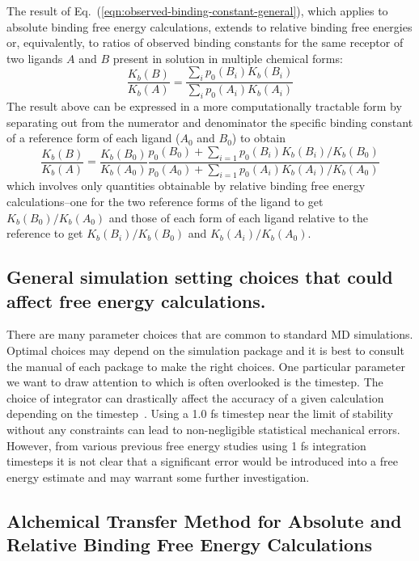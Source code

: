 \documentclass[9pt,bestpractices]{livecoms}
\begin{document}
The result of Eq.~(\ref{eqn:observed-binding-constant-general}), which applies to absolute binding free energy calculations, extends to relative binding free energies or, equivalently, to ratios of observed binding constants for the same receptor of two ligands $A$ and $B$ present in solution in multiple chemical forms:
\begin{equation}
  \frac{K_b(B)}{K_b(A)} = \frac{\sum_i p_0(B_i) K_b(B_i)}{\sum_i p_0(A_i) K_b(A_i)}
  \label{eqn:observed-binding-constant-ratio}
\end{equation}
The result above can be expressed in a more computationally tractable form by separating out from the numerator and denominator the specific binding constant of a reference form of each ligand ($A_0$ and $B_0$) to obtain\cite{de2018rigorous}
\begin{equation}
 \frac{K_b(B)}{K_b(A)} = \frac{K_b(B_0)}{K_b(A_0)} \frac{
 p_0(B_0) + \sum_{i=1} p_0(B_i) K_b(B_i)/K_b(B_0)
 }{
p_0(A_0) + \sum_{i=1} p_0(A_i) K_b(A_i)/K_b(A_0)
 }
\end{equation}
which involves only quantities obtainable by relative binding free energy calculations--one for the two reference forms of the ligand to get  $K_b(B_0)/K_b(A_0)$ and those of each form of each ligand relative to the reference to get $K_b(B_i)/K_b(B_0)$ and $K_b(A_i)/K_b(A_0)$.

\subsection{General simulation setting choices that could affect free energy calculations.}
There are many parameter choices that are common to standard MD simulations. Optimal choices may depend on the simulation package and it is best to consult the manual of each package to make the right choices. One particular parameter we want to draw attention to which is often overlooked is the timestep. The choice of integrator can drastically affect the accuracy of a given calculation depending on the timestep~\cite{leimkuhler2016efficient}. Using a 1.0 fs timestep near the limit of stability without any constraints can lead to non-negligible statistical mechanical errors. However, from various previous free energy studies using 1 fs integration timesteps it is not clear that a significant error would be introduced into a free energy estimate and may warrant some further investigation.  

\subsection{Alchemical Transfer Method for Absolute and Relative Binding Free Energy Calculations}
\label{sec:atm}
\end{document}
